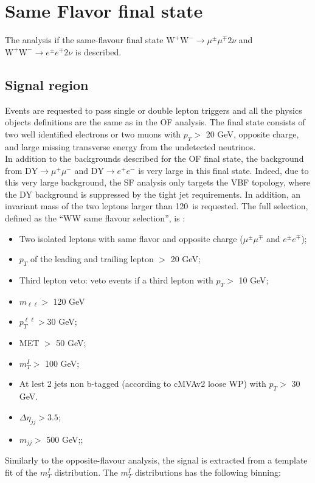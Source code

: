 \newpage
\section{Same Flavor final state}\label{sec:SF}
The analysis if the same-flavour final state $\mathrm{W^+W^-}\to \mu^{\pm}
\mu^{\mp}  2\nu$ and  $\mathrm{W^+W^-}\to e^{\pm} e^{\mp}  2\nu$ is described.
\subsection*{Signal region}
Events are requested to pass single or double lepton triggers and all the
physics objects definitions are the same as in the OF analysis.
The final state consists of two well identified electrons or two muons with
$p_T >$ 20 GeV, opposite charge, and large missing transverse energy from the undetected neutrinos.\\
In addition to the backgrounds described for the OF final state, the
background from $\mathrm{DY}\to \mu^{+} \mu^{-}$ and
$\mathrm{DY}\to e^{+} e^{-}$ is very large in this final state.
Indeed, due to this very large background, the SF analysis only targets the
VBF topology, where the DY background is suppressed by the tight 
jet requirements. In addition, an invariant mass of the two leptons larger
than 120~\GeV is requested.
The full selection, defined as the ``WW same flavour selection'', is :
\begin{itemize}
\item Two isolated leptons with same flavor and opposite charge ($\mu ^{\pm} \mu^{\mp}$ and $e^{\pm} e^{\mp}$);
\item $p_T$ of the leading and trailing lepton $>$ 20 GeV;
\item Third lepton veto: veto events if a third lepton with $p_T  >$ 10 GeV;
\item  $m_{\ell \ell} >$ 120 GeV 
\item $p_T^{\ell \ell} >$30 GeV;
\item MET $>$ 50 GeV;
\item $m_T^I >$ 100 GeV;
\item At lest 2 jets non b-tagged (according to cMVAv2 loose WP) with $p_T >$ 30 GeV.
\item $\Delta \eta_{jj} > 3.5$;
\item $m_{jj} >$ 500 GeV;;
\end{itemize}
Similarly to the opposite-flavour analysis, the signal is extracted from a template fit of
the $m_T^I$ distribution.
The $m_T^I$ distributions has the following binning:
